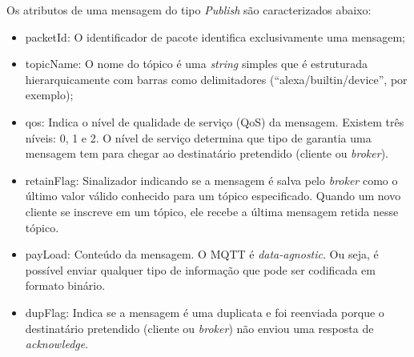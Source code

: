 Os atributos de uma mensagem do tipo \textit{Publish} são caracterizados abaixo:
\begin{itemize}
	\item packetId: O identificador de pacote identifica exclusivamente uma mensagem;
	\item topicName: O nome do tópico é uma \textit{string} simples que é estruturada hierarquicamente com barras como delimitadores (“alexa/builtin/device”, por exemplo);
	\item qos: Indica o nível de qualidade de serviço (QoS) da mensagem. Existem três níveis: 0, 1 e 2. O nível de serviço determina que tipo de garantia uma mensagem tem para chegar ao destinatário pretendido (cliente ou \textit{broker}).
	\item retainFlag: Sinalizador indicando se a mensagem é salva pelo \textit{broker} como o último valor válido conhecido para um tópico especificado. Quando um novo cliente se inscreve em um tópico, ele recebe a última mensagem retida nesse tópico.
	\item payLoad: Conteúdo  da mensagem. O MQTT é \textit{data-agnostic}. Ou seja, é possível enviar qualquer tipo de informação que pode ser codificada em formato binário.
	\item dupFlag: Indica se a mensagem é uma duplicata e foi reenviada porque o destinatário pretendido (cliente ou \textit{broker}) não enviou uma resposta de \textit{acknowledge}.
\end{itemize}

